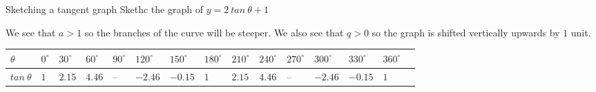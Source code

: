 \begin{wex}{Sketching a tangent graph}
 {
Skethc the graph of $y=2~tan~\theta+1$
}
{
We see that $a>1$ so the branches of the curve will be steeper. We also see that $q>0$ so the graph is shifted vertically upwards by $1$ unit.
\begin{table}[H]


\begin{tabular}{|m{0.6cm}|m{0.3cm}|m{0.5cm}|m{0.5cm}|m{0.3cm}|m{0.65cm}|m{0.65cm}|m{0.4cm}|m{0.5cm}|m{0.5cm}|m{0.4cm}|m{0.65cm}|m{0.7cm}|m{0.5cm}|} \hline

\footnotesize$\theta $&
\footnotesize$0^{\circ }$&
\footnotesize$30^{\circ }$&
\footnotesize$60^{\circ }$&
\footnotesize$90^{\circ }$&
\footnotesize$120^{\circ }$&
\footnotesize$150^{\circ }$&
\footnotesize$180^{\circ }$&
\footnotesize$210^{\circ }$&
\footnotesize$240^{\circ }$&
\footnotesize$270^{\circ }$&
\footnotesize$300^{\circ }$&
\footnotesize$330^{\circ }$&
\footnotesize$360^{\circ }$
\\ \hline

\footnotesize$tan~\theta $&
\footnotesize$1$&
\footnotesize$2.15$&
\footnotesize$4.46$&
\footnotesize --&
\footnotesize$-2.46$&
\footnotesize$-0.15$&
\footnotesize$1$&
\footnotesize$2.15$&
\footnotesize$4.46$&
\footnotesize--&
\footnotesize$-2.46$&
\footnotesize$-0.15$&
\footnotesize$1$&

 \hline
\end{tabular}

\end{table}


% 


}
\end{wex}
